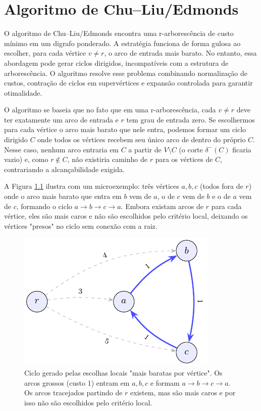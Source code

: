 \chapter{Algoritmo de Chu–Liu/Edmonds}

O algoritmo de Chu–Liu/Edmonds encontra uma r-arborescência de custo mínimo em um digrafo ponderado. A estratégia funciona de forma gulosa ao escolher, para cada vértice \(v\neq r\), o arco de entrada mais barato. No entanto, essa abordagem pode gerar ciclos dirigidos, incompatíveis com a estrutura de arborescência. O algoritmo resolve esse problema combinando normalização de custos, contração de ciclos em supervértices e expansão controlada para garantir otimalidade.

O algoritmo se baseia que no fato que em uma r-arborescência, cada \(v\neq r\) deve ter exatamente um arco de entrada e \(r\) tem grau de entrada zero. Se escolhermos para cada vértice o arco mais barato que nele entra, podemos formar um ciclo dirigido \(C\) onde todos os vértices recebem seu único arco de dentro do próprio \(C\). Nesse caso, nenhum arco entraria em \(C\) a partir de \(V\setminus C\) (o corte \(\delta^-(C)\) ficaria vazio) e, como \(r\notin C\), não existiria caminho de \(r\) para os vértices de \(C\), contrariando a alcançabilidade exigida.

A Figura \ref{fig:chu-liu-cycle-micro} ilustra com um microexemplo: três vértices \(a,b,c\) (todos fora de \(r\)) onde o arco mais barato que entra em \(b\) vem de \(a\), o de \(c\) vem de \(b\) e o de \(a\) vem de \(c\), formando o ciclo \(a\to b\to c\to a\). Embora existam arcos de \(r\) para cada vértice, eles são mais caros e não são escolhidos pelo critério local, deixando os vértices "presos" no ciclo sem conexão com a raiz.

\begin{figure}[H]
    \centering
    \includegraphics[width=0.9\linewidth]{figures/fig_chu_liu_cycle_micro.pdf}
    \caption{Ciclo gerado pelas escolhas locais "mais baratas por vértice". Os arcos grossos (custo 1) entram em \(a,b,c\) e formam \(a\to b\to c\to a\). Os arcos tracejados partindo de \(r\) existem, mas são mais caros e por isso não são escolhidos pelo critério local.}
    \label{fig:chu-liu-cycle-micro}
\end{figure}

